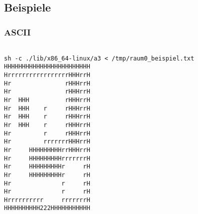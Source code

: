 \documentclass[10pt,a4paper]{article}
\begin{document}
\subsection{Beispiele}  

\subsubsection{ASCII}
{\footnotesize
\begin{verbatim}

sh -c ./lib/x86_64-linux/a3 < /tmp/raum0_beispiel.txt 
HHHHHHHHHHHHHHHHHHHHHHHH
HrrrrrrrrrrrrrrrrrHHHrrH
Hr               rHHHrrH
Hr               rHHHrrH
Hr  HHH          rHHHrrH
Hr  HHH    r     rHHHrrH
Hr  HHH    r     rHHHrrH
Hr  HHH    r     rHHHrrH
Hr         r     rHHHrrH
Hr         rrrrrrrHHHrrH
Hr     HHHHHHHHHrrHHHrrH
Hr     HHHHHHHHHrrrrrrrH
Hr     HHHHHHHHHr     rH
Hr     HHHHHHHHHr     rH
Hr              r     rH
Hr              r     rH
Hrrrrrrrrrr     rrrrrrrH
HHHHHHHHHH222HHHHHHHHHHH





\end{verbatim}}
\end{document}
